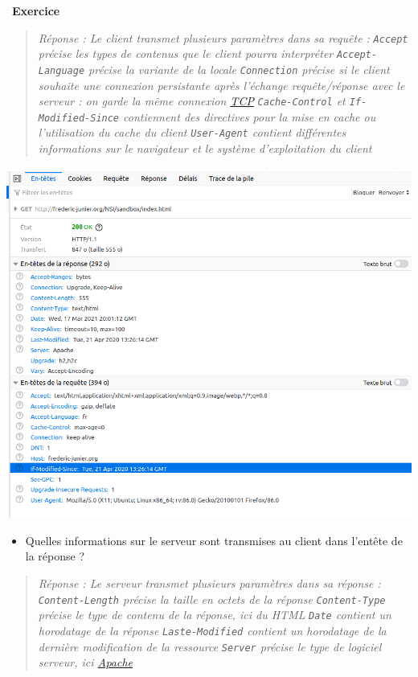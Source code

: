 \documentclass[
  11pt,
]{article}
\newcommand{\passthrough}[1]{#1}
\providecommand{\tightlist}{%
  \setlength{\itemsep}{0pt}\setlength{\parskip}{0pt}}
\newcounter{exo}
\newenvironment{exercice}[1]
{\par \medskip   \addtocounter{exo}{1} \noindent  
\begin{bclogo}[arrondi =0.1,   noborder = true, logo=\bccrayon, marge=4]{~\textbf{Exercice} \textbf{\theexo} {\itshape #1} }  \par}
{
\end{bclogo}
 \par \bigskip }
\newcounter{logi}
\begin{document}
\begin{exercice}{}
\begin{enumerate}
\begin{itemize}
    \begin{quote}
    \emph{Réponse : Le client transmet plusieurs paramètres dans sa
    requête :} \emph{\passthrough{\lstinline!Accept!} précise les types
    de contenus que le client pourra interpréter}
    \emph{\passthrough{\lstinline!Accept-Language!} précise la variante
    de la locale} \emph{\passthrough{\lstinline!Connection!} précise si
    le client souhaite une connexion persistante après l'échange
    requête/réponse avec le serveur : on garde la même connexion
    \url{TCP}} \emph{\passthrough{\lstinline!Cache-Control!} et
    \passthrough{\lstinline!If-Modified-Since!} contiennent des
    directives pour la mise en cache ou l'utilisation du cache du
    client} \emph{\passthrough{\lstinline!User-Agent!} contient
    différentes informations sur le navigateur et le système
    d'exploitation du client}
    \end{quote}
  \end{itemize}

  \includegraphics[width=1\textwidth,height=\textheight]{images/en_tete_http.png}\\

  \begin{itemize}
  \tightlist
  \item
    Quelles informations sur le serveur sont transmises au client dans
    l'entête de la réponse ?
  \end{itemize}

  \begin{quote}
  \emph{Réponse : Le serveur transmet plusieurs paramètres dans sa
  réponse :} \emph{\passthrough{\lstinline!Content-Length!} précise la
  taille en octets de la réponse}
  \emph{\passthrough{\lstinline!Content-Type!} précise le type de
  contenu de la réponse, ici du HTML}
  \emph{\passthrough{\lstinline!Date!} contient un horodatage de la
  réponse} \emph{\passthrough{\lstinline!Laste-Modified!} contient un
  horodatage de la dernière modification de la ressource}
  \emph{\passthrough{\lstinline!Server!} précise le type de logiciel
  serveur, ici \href{http://www.apache.org/}{Apache}}
  \end{quote}


\end{enumerate}
\end{exercice}
\end{document}
